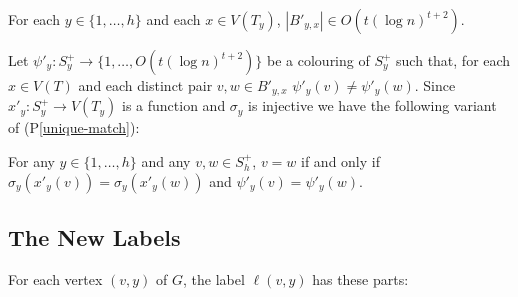 \documentclass{patmorin}
\newcommand{\pref}[1]{(P\ref{#1})}
\newcommand{\psref}[1]{(P\ref{#1}$'$)}
\begin{document}
\begin{compactenum}[(P1$'$)]\setcounter{enumi}{2}
    \item For each $y\in\{1,\ldots,h\}$ and each $x\in V(T_y)$, $|B'_{y,x}|\in O(t(\log n)^{t+2})$. \label{small-bags-ii}
\end{compactenum}



Let $\psi'_y:S^+_y\to\{1,\ldots,O(t(\log n)^{t+2})\}$ be a colouring of $S^+_y$ such that, for each $x\in V(T)$ and each distinct pair $v,w\in B'_{y,x}$ $\psi'_y(v)\neq\psi'_y(w)$.  Since $x'_y:S^+_y\to V(T_y)$ is a function and $\sigma_y$ is injective we have the following variant of \pref{unique-match}:

\begin{compactenum}[(P1$'$)]\setcounter{enumi}{3}
    \item For any $y\in\{1,\ldots,h\}$ and any $v,w\in S^+_h$,  $v=w$ if and only if  $\sigma_y(x'_y(v))= \sigma_y(x'_y(w)) $ and $\psi'_y(v)=\psi'_y(w)$.\label{unique-match-ii}
\end{compactenum}

\subsection{The New Labels}


For each vertex $(v,y)$ of $G$, the label $\ell(v,y)$ has these parts:
\end{document}
